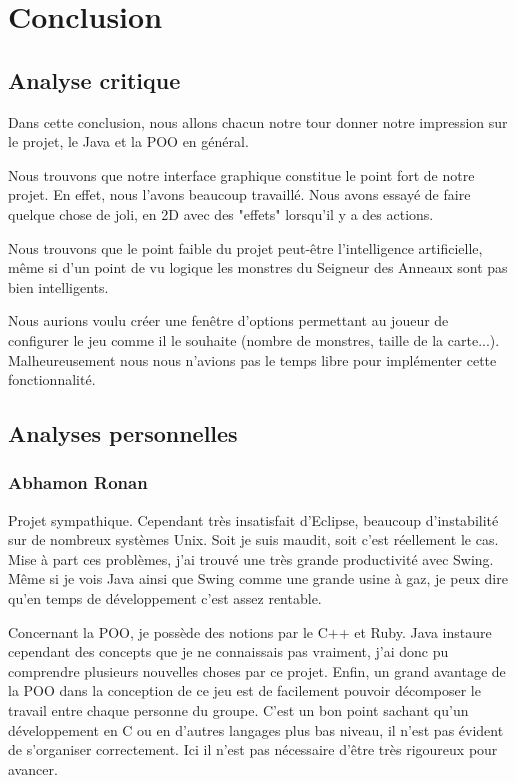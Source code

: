 \documentclass{article}
\begin{document}
\section{Conclusion}
\subsection{Analyse critique}
Dans cette conclusion, nous allons chacun notre tour donner notre impression sur le projet, le Java et la POO en général.

Nous trouvons que notre interface graphique constitue le point fort de notre projet. En effet, nous l'avons beaucoup travaillé.
Nous avons essayé de faire quelque chose de joli, en 2D avec des "effets" lorsqu'il y a des actions.

Nous trouvons que le point faible du projet peut-être l'intelligence artificielle, même si d'un point de vu logique les monstres du Seigneur des Anneaux sont pas bien intelligents.

Nous aurions voulu créer une fenêtre d'options permettant au joueur de configurer le jeu comme il le souhaite (nombre de monstres, taille de la carte...).
Malheureusement nous nous n'avions pas le temps libre pour implémenter cette fonctionnalité.

\subsection{Analyses personnelles}
  \subsubsection{Abhamon Ronan}
  Projet sympathique. Cependant très insatisfait d'Eclipse, beaucoup d'instabilité sur de nombreux systèmes Unix.
  Soit je suis maudit, soit c'est réellement le cas.
  Mise à part ces problèmes, j'ai trouvé une très grande productivité avec Swing.
  Même si je vois Java ainsi que Swing comme une grande usine à gaz, je peux dire qu'en temps de développement c'est assez rentable. 

  Concernant la POO, je possède des notions par le C++ et Ruby.
  Java instaure cependant des concepts que je ne connaissais pas vraiment, j'ai donc pu comprendre plusieurs nouvelles choses par ce projet. 
  Enfin, un grand avantage de la POO dans la conception de ce jeu est de facilement pouvoir décomposer le travail entre chaque personne du groupe.
  C'est un bon point sachant qu'un développement en C ou en d'autres langages plus bas niveau, il n'est pas évident de s'organiser correctement.
  Ici il n'est pas nécessaire d'être très rigoureux pour avancer.
\end{document}
